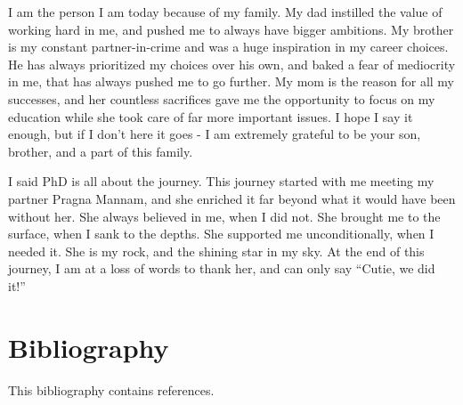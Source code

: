 \documentclass[11pt]{cmuthesis}
\begin{document}
\begin{acknowledgments}
  I am the person I am today because of my family. My dad instilled
  the value of working hard in me, and pushed me to always have bigger
  ambitions. My brother is my constant partner-in-crime and was a huge
  inspiration in my career choices. He has always prioritized my
  choices over his own, and baked a fear of mediocrity in me, that
  has always pushed me to go further. My mom is the reason for all my
  successes, and her countless sacrifices gave me the opportunity to
  focus on my education while she took care of far more important
  issues. I hope I say it enough, but if I don't here it goes - I am
  extremely grateful to be your son, brother, and a part of this
  family. 

  I said PhD is all about the journey. This journey started with me
  meeting my partner Pragna Mannam, and she enriched it far beyond
  what it would have been without her. She always believed in me, when
  I did not. She brought me to the surface, when I sank to the
  depths. She supported me unconditionally, when I needed it. She is
  my rock, and the shining star in my sky. At the end of this journey,
  I am at a loss of words to thank her, and can only say ``Cutie, we
  did it!''
\end{acknowledgments}
\restoregeometry

\pagestyle{plain}

\tableofcontents
{}
\listoffigures
{}
\listoftables
\listofalgorithms

\mainmatter



%




%




\chapter*{Bibliography}

\vspace{-25mm}
This bibliography contains  references.
\vspace{10mm}

\printbibliography[heading=none]
\end{document}
